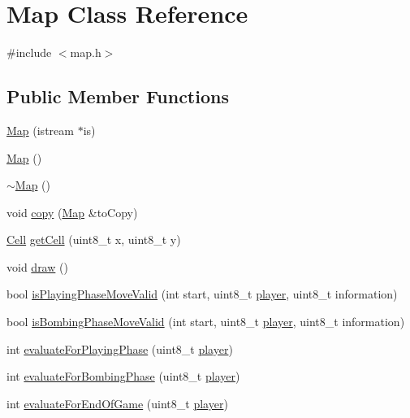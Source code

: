 \hypertarget{class_map}{}\section{Map Class Reference}
\label{class_map}


{\ttfamily \#include $<$map.\+h$>$}

\subsection*{Public Member Functions}
\begin{DoxyCompactItemize}
\item 
\hyperlink{class_map_a0344fb7c7fdc8caeaa6b7d0c418d6e66}{Map} (istream $\ast$is)
\item 
\hyperlink{class_map_a0f5ad0fd4563497b4214038cbca8b582}{Map} ()
\item 
\hyperlink{class_map_aa403fbe09394ccf39747588f5168e3b2}{$\sim$\+Map} ()
\item 
void \hyperlink{class_map_ace2343440c14bea0eb2e8ffa043f4c59}{copy} (\hyperlink{class_map}{Map} \&to\+Copy)
\item 
\hyperlink{struct_cell}{Cell} \hyperlink{class_map_adb0eda229eadaeed3b9a5d2d3ee50549}{get\+Cell} (uint8\+\_\+t x, uint8\+\_\+t y)
\item 
void \hyperlink{class_map_a6a40755f8541eece2fa48e9e24a588f8}{draw} ()
\item 
bool \hyperlink{class_map_a2129c01193c7b34b8fb6db5b695ef953}{is\+Playing\+Phase\+Move\+Valid} (int start, uint8\+\_\+t \hyperlink{_reversi_a_i_8cpp_ae41164029686cac80f7f6bd7aa23b153}{player}, uint8\+\_\+t information)
\item 
bool \hyperlink{class_map_a605e1a97fe448d9d23a9cd99b43b3c3b}{is\+Bombing\+Phase\+Move\+Valid} (int start, uint8\+\_\+t \hyperlink{_reversi_a_i_8cpp_ae41164029686cac80f7f6bd7aa23b153}{player}, uint8\+\_\+t information)
\item 
int \hyperlink{class_map_aeafd05aa13c00156d4aee87892c618b6}{evaluate\+For\+Playing\+Phase} (uint8\+\_\+t \hyperlink{_reversi_a_i_8cpp_ae41164029686cac80f7f6bd7aa23b153}{player})
\item 
int \hyperlink{class_map_a7b7dbc7b9162aff8733c82cef608fd66}{evaluate\+For\+Bombing\+Phase} (uint8\+\_\+t \hyperlink{_reversi_a_i_8cpp_ae41164029686cac80f7f6bd7aa23b153}{player})
\item 
int \hyperlink{class_map_ab06b971571ade2d00b808e017d914bfe}{evaluate\+For\+End\+Of\+Game} (uint8\+\_\+t \hyperlink{_reversi_a_i_8cpp_ae41164029686cac80f7f6bd7aa23b153}{player})

\end{DoxyCompactItemize}
